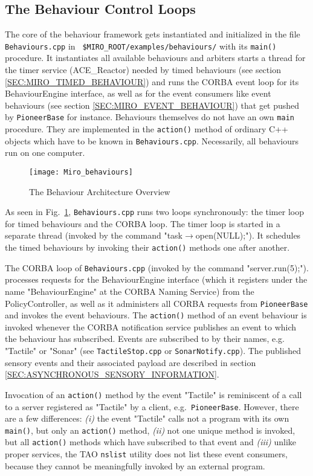 \subsection{The Behaviour Control Loops}

The core of the behaviour framework gets instantiated and initialized
in the file {\tt Behaviours.cpp} in {\tt
  \$MIRO\_ROOT/examples/behaviours/} with its {\tt main()} procedure.
It instantiates all available behaviours and arbiters starts a thread
for the timer service (ACE\_Reactor) needed by timed behaviours (see
section \ref{SEC:MIRO_TIMED_BEHAVIOUR}) and runs the CORBA event loop
for its BehaviourEngine interface, as well as for the event consumers
like event behaviours (see section \ref{SEC:MIRO_EVENT_BEHAVIOUR})
that get pushed by {\tt PioneerBase} for instance.  Behaviours
themselves do not have an own {\tt main} procedure.  They are
implemented in the {\tt action()} method of ordinary C++ objects which
have to be known in {\tt Behaviours.cpp}.  Necessarily, all behaviours
run on one computer.

\begin{figure}[!ht]
  \texttt{[image: Miro\_behaviours]}
  \caption{The Behaviour Architecture Overview}
  \label{FIG_BEHAVIOUR_ARCHITECTURE}
\end{figure}


As seen in Fig.~\ref{FIG_BEHAVIOUR_ARCHITECTURE}, {\tt Behaviours.cpp}
runs two loops synchronously: the timer loop for timed behaviours and
the CORBA loop.
The timer loop is started in a separate thread (invoked by the command
"task$\rightarrow$open(NULL);").
It schedules the timed behaviours
by invoking their {\tt action()} methods one after another. 

The CORBA loop of {\tt Behaviours.cpp} (invoked by the command
"server.run(5);").  processes requests for the BehaviourEngine
interface (which it registers under the name "BehaviourEngine" at the
CORBA Naming Service) from the PolicyController, as well as it
administers all CORBA requests from {\tt PioneerBase} and invokes the
event behaviours.  The {\tt action()} method of an event behaviour is
invoked whenever the CORBA notification service publishes an event to
which the behaviour has subscribed.  Events are subscribed to by their
names, e.g. "Tactile" or "Sonar" (see {\tt TactileStop.cpp} or 
{\tt SonarNotify.cpp}). The published sensory events and their associated
payload are described in section \ref{SEC:ASYNCHRONOUS_SENSORY_INFORMATION}.

Invocation of an {\tt action()} method by the event "Tactile"
is reminiscent of a call to a server registered as "Tactile" by a client,
e.g.\ {\tt PioneerBase}. However, there are a few differences:
{\sl (i)} the event "Tactile" calls not a program with its own
{\tt main()}, but only an {\tt action()} method,
{\sl (ii)} not one unique method is invoked,
but all {\tt action()} methods which have subscribed to that event and
{\sl (iii)} unlike proper services, the TAO {\tt nslist} utility does
not list these event consumers,
because they cannot be meaningfully invoked by an external program.


